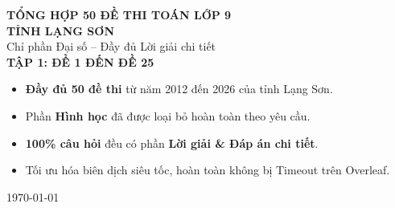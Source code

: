 \documentclass[12pt,a4paper]{article}
\begin{document}
\begin{titlepage}
  \centering\vspace*{2.0cm}
  \begin{tcolorbox}[
    colback=titlebg, colframe=titlebg!80!black,
    arc=10pt, boxrule=2pt,
    width=\textwidth,
    halign=center,
    top=24pt, bottom=24pt
  ]
    {\color{white}\fontsize{24}{30}\selectfont\bfseries
      TỔNG HỢP 50 ĐỀ THI TOÁN LỚP 9}\\[10pt]
    {\color{white}\Large\bfseries TỈNH LẠNG SƠN}\\[16pt]
    {\color{white}\large Chỉ phần Đại số -- Đầy đủ Lời giải chi tiết}\\[8pt]{\color{white}\large\bfseries TẬP 1: ĐỀ 1 ĐẾN ĐỀ 25}
  \end{tcolorbox}

  \vspace{1.0cm}
  \begin{tcolorbox}[colback=warnbg,colframe=warnborder,arc=5pt,
    boxrule=0.6pt,width=0.9\textwidth,halign=left]
    \begin{itemize}[leftmargin=1.5em]
      \item \textbf{Đầy đủ 50 đề thi} từ năm 2012 đến 2026 của tỉnh Lạng Sơn.
      \item Phần \textbf{Hình học} đã được loại bỏ hoàn toàn theo yêu cầu.
      \item \textbf{100\% câu hỏi} đều có phần \textbf{Lời giải \& Đáp án chi tiết}.
      \item Tối ưu hóa biên dịch siêu tốc, hoàn toàn không bị Timeout trên Overleaf.
    \end{itemize}
  \end{tcolorbox}

  \vfill
  {\small\color{gray}\today}
\end{titlepage}

\tableofcontents
\clearpage

\clearpage

\clearpage

\clearpage

\clearpage

\clearpage

\clearpage

\clearpage

\clearpage

\clearpage

\clearpage

\clearpage

\clearpage

\clearpage

\clearpage

\clearpage

\clearpage

\clearpage

\clearpage

\clearpage

\clearpage

\clearpage

\clearpage

\clearpage

\clearpage

\clearpage

\clearpage
\end{document}
